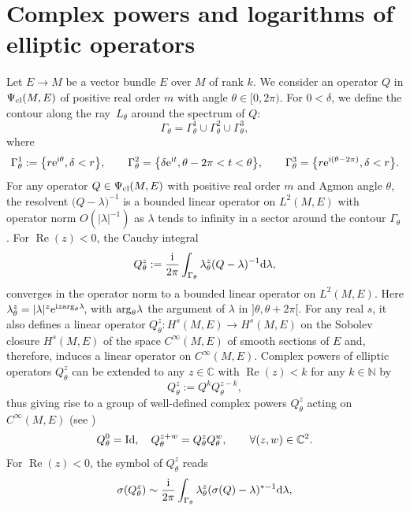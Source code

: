 \documentclass[10pt,a4paper]{amsart}
\numberwithin{equation}{section}
\theoremstyle{definition}
\newcommand{\C}{\mathbb C}
\newcommand{\N}{\mathbb N}
\begin{document}
\section{Complex powers and logarithms of elliptic operators}\label{appendix2}
Let $E\to M$ be a vector bundle $E$ over $M$ of rank $k$. We consider an operator $Q$ in $\Psi_{\rm cl}(M, E)$ of positive real order $m$ with angle $\theta\in [0,2\pi)$. For $0<\delta$, we define the contour along the ray~$L_\theta$ around the spectrum of $Q$:
\[\Gamma_\theta=\Gamma_\theta^1\cup \Gamma_\theta^2\cup \Gamma_\theta^3 ,\]
where
\[\Gamma_\theta^1:=\bigl\{r{\rm e}^{{\rm i}\theta}, \delta< r\bigr\},\qquad \Gamma_\theta^2=\bigl\{\delta {\rm e}^{{\rm i}t}, \theta-2\pi< t<\theta\bigr\},\qquad \Gamma_\theta^3=\bigl\{r {\rm e}^{{\rm i}(\theta-2\pi)}, \delta< r\bigr\}.\]
For any operator $Q\in \Psi_{\rm cl}(M, E)$ with positive real order $m$ and Agmon angle $\theta$, the resolvent $\bigl(Q-\lambda\bigr)^{-1}$ is a bounded linear operator on $L^2(M, E)$ with operator norm $O(\vert \lambda\vert^{-1})$ as $\lambda$ tends to infinity in a sector around the contour $\Gamma_\theta$. For $\operatorname{Re}(z)<0$,
	the Cauchy integral \cite[equation~(1.5.7.1)]{Sc}
	\begin{equation*}
		Q_\theta^z:=\frac{{\rm i}}{2\pi}\int_{\Gamma_{\theta}} \lambda_\theta^z (Q-\lambda)^{-1} {\rm d}\lambda,\end{equation*}
	converges in the operator norm to a bounded linear operator on $L^2(M,E) $. Here $\lambda_\theta^z= \vert \lambda\vert^z {\rm e}^{{\rm i} z {\rm arg}_\theta\lambda}\!$, with ${\rm arg}_\theta\lambda$ the argument of $\lambda$ in $]\theta, \theta+2\pi[$.
For any real $s$, it also defines a linear operator $Q_\theta^z\colon H^s(M, E)\to H^s (M, E)$ on the Sobolev closure $H^s(M,E)$ of the space $C^\infty(M,E)$ of smooth sections of $E$ and, therefore, induces a linear operator on $C^\infty(M,E)$. Complex powers of elliptic operators $Q_\theta^z$ can be extended to any $z\in \C$ with $\operatorname{Re}(z)<k$ for any $k\in \N$ by
	\begin{equation}\label{eq:zmoinsk} Q_\theta^{z}:= Q^k Q_\theta^{z-k},\end{equation} thus giving rise to a group of well-defined complex powers $Q_\theta^z$ acting on $C^\infty(M,E)$ (see \cite[Section~1.5.7.1]{Sc})
	\[Q_\theta^0={\rm Id}, \quad Q_\theta^{z+w}=Q_\theta^{z} Q_\theta^{w},\qquad \forall (z,w)\in \C^2.\]
For $\operatorname{Re}(z)<0$, the symbol of $Q_\theta^{z}$ reads \cite[formula~(4.8.2.6)]{Sc}
\begin{equation*}	
\sigma(Q_\theta^{z})\sim\frac{{\rm i}}{2\pi} \int_{\Gamma_\theta} \lambda_\theta^{z} (\sigma(Q)-\lambda)^{*-1} {\rm d}\lambda,\end{equation*}
\end{document}
